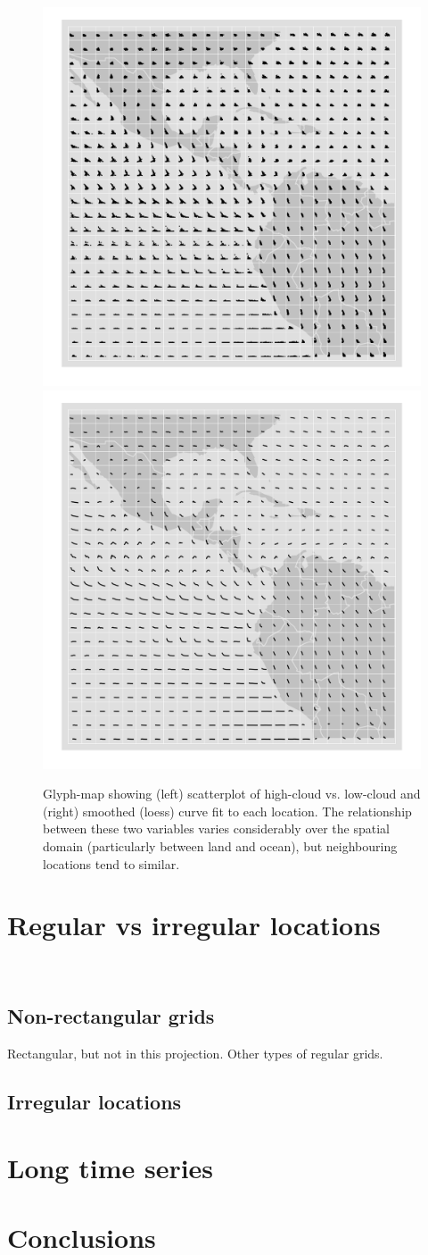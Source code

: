 \documentclass[oneside]{article}
\begin{document}
\begin{figure}[htbp]
  \centering
  \includegraphics[width=0.5\linewidth]{clouds}%
  \includegraphics[width=0.5\linewidth]{clouds-smooth}

  \caption{Glyph-map showing (left) scatterplot of high-cloud vs. low-cloud and (right) smoothed (loess) curve fit to each location. The relationship between these two variables varies considerably over the spatial domain (particularly between land and ocean), but neighbouring locations tend to similar. }
  \label{fig:cloud}
\end{figure}


\section{Regular vs irregular locations}~\label{sec:irregular}

\subsection{Non-rectangular grids}

Rectangular, but not in this projection.  Other types of regular grids.

\subsection{Irregular locations}

\section{Long time series}

\section{Conclusions}


\end{document}

